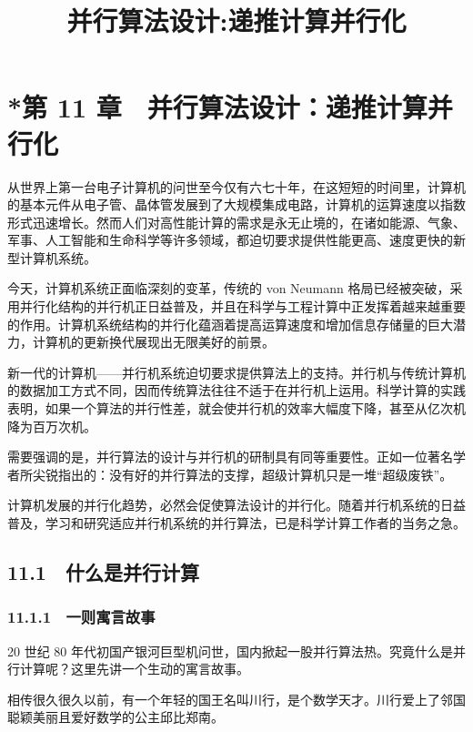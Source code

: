 \documentclass[
  10pt,
  fontset=fandol]{ctexart}
\title{并行算法设计:递推计算并行化}
\author{}
\date{}
\begin{document}
\maketitle

\section{*第 11 章　并行算法设计：递推计算并行化}\label{ux7b2c-11-ux7ae0-ux5e76ux884cux7b97ux6cd5ux8bbeux8ba1ux9012ux63a8ux8ba1ux7b97ux5e76ux884cux5316}

从世界上第一台电子计算机的问世至今仅有六七十年，在这短短的时间里，计算机的基本元件从电子管、晶体管发展到了大规模集成电路，计算机的运算速度以指数形式迅速增长。然而人们对高性能计算的需求是永无止境的，在诸如能源、气象、军事、人工智能和生命科学等许多领域，都迫切要求提供性能更高、速度更快的新型计算机系统。

今天，计算机系统正面临深刻的变革，传统的 von Neumann 格局已经被突破，采用并行化结构的并行机正日益普及，并且在科学与工程计算中正发挥着越来越重要的作用。计算机系统结构的并行化蕴涵着提高运算速度和增加信息存储量的巨大潜力，计算机的更新换代展现出无限美好的前景。

新一代的计算机------并行机系统迫切要求提供算法上的支持。并行机与传统计算机的数据加工方式不同，因而传统算法往往不适于在并行机上运用。科学计算的实践表明，如果一个算法的并行性差，就会使并行机的效率大幅度下降，甚至从亿次机降为百万次机。

需要强调的是，并行算法的设计与并行机的研制具有同等重要性。正如一位著名学者所尖锐指出的：没有好的并行算法的支撑，超级计算机只是一堆``超级废铁''。

计算机发展的并行化趋势，必然会促使算法设计的并行化。随着并行机系统的日益普及，学习和研究适应并行机系统的并行算法，已是科学计算工作者的当务之急。

\subsection{11.1　什么是并行计算}\label{ux4ec0ux4e48ux662fux5e76ux884cux8ba1ux7b97}

\subsubsection{11.1.1　一则寓言故事}\label{ux4e00ux5219ux5bd3ux8a00ux6545ux4e8b}

20 世纪 80 年代初国产银河巨型机问世，国内掀起一股并行算法热。究竟什么是并行计算呢？这里先讲一个生动的寓言故事。

相传很久很久以前，有一个年轻的国王名叫川行，是个数学天才。川行爱上了邻国聪颖美丽且爱好数学的公主邱比郑南。
\end{document}
